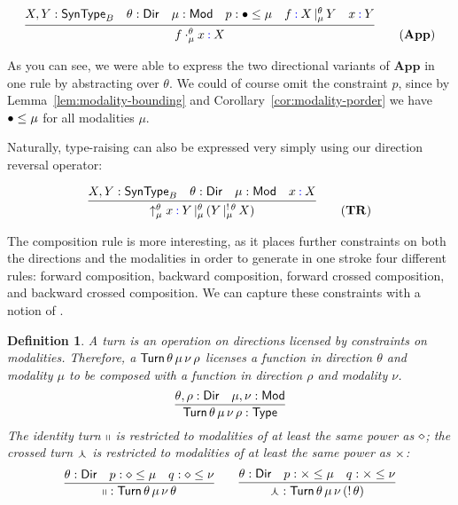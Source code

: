 \documentclass{amsart}
\newtheorem{definition}[theorem]{Definition}
\begin{document}
\begin{equation}
  \infer{f \cdot^\theta_\mu x \syn:X}
  {
    X, Y : \ty{SynType}_B &
    \theta : \ty{Dir} &
    \mu : \ty{Mod} &
    p : \con\bullet\leq\mu &
    f \syn: \arrty X|[\theta,\mu] Y &
    x \syn: Y
  }\tag{$\mathbf{App}$}
\end{equation}

As you can see, we were able to express the two directional variants of
$\mathbf{App}$ in one rule by abstracting over $\theta$. We could of
course omit the constraint $p$, since by
Lemma~\ref{lem:modality-bounding} and
Corollary~\ref{cor:modality-porder} we have $\mathsf{\bullet}\leq\mu$ for all
modalities $\mu$.

Naturally, type-raising can also be expressed very simply using our
direction reversal operator:

\begin{equation}
  \infer{\uparrow^\theta_\mu x \syn: \arrty Y|[\theta,\mu](\arrty Y|[!\,\theta, \mu] X)}
  {
    X, Y : \ty{SynType}_B &
    \theta : \ty{Dir} &
    \mu : \ty{Mod} &
    x \syn: X
  }\tag{$\mathbf{TR}$}
\end{equation}

The composition rule is more interesting, as it places further
constraints on both the directions and the modalities in order to
generate in one stroke four different rules: forward composition,
backward composition, forward crossed composition, and backward crossed
composition. We can capture these constraints with a notion of
.

\begin{definition}
  A \emph{turn} is an operation on directions licensed by
  constraints on modalities. Therefore, a $\mathsf{Turn}\,
  \theta\,\mu\,\nu\,\rho$ licenses a function in direction $\theta$
  and modality $\mu$ to be composed with a function in direction
  $\rho$ and modality $\nu$.
  \[
    \infer{\ty{Turn}\,\theta\,\mu\,\nu\,\rho : \ty{Type}}
    {
      \theta,\rho : \ty{Dir} &
      \mu, \nu: \ty {Mod}
    }
  \]
  The identity turn $\mathsf{\shortparallel}$ is restricted to modalities
  of at least the same power as $\mathsf{\diamond}$; the crossed turn
  $\mathsf{\curlywedge}$ is restricted to modalities of at least the same
  power as $\mathsf{\times}$:
  \[
    \infer{\con\shortparallel : \ty{Turn}\,\theta\,\mu\,\nu\,\theta}
    {
      \theta : \ty{Dir} &
      p : \con\diamond\leq\mu &
      q : \con\diamond\leq\nu
    }
    \qquad
    \infer{\con\curlywedge : \ty{Turn}\,\theta\,\mu\,\nu\,(!\,\theta)}
    {
      \theta : \ty{Dir} &
      p : \con\times\leq\mu &
      q : \con\times\leq\nu
    }
  \]
\end{definition}
\end{document}
